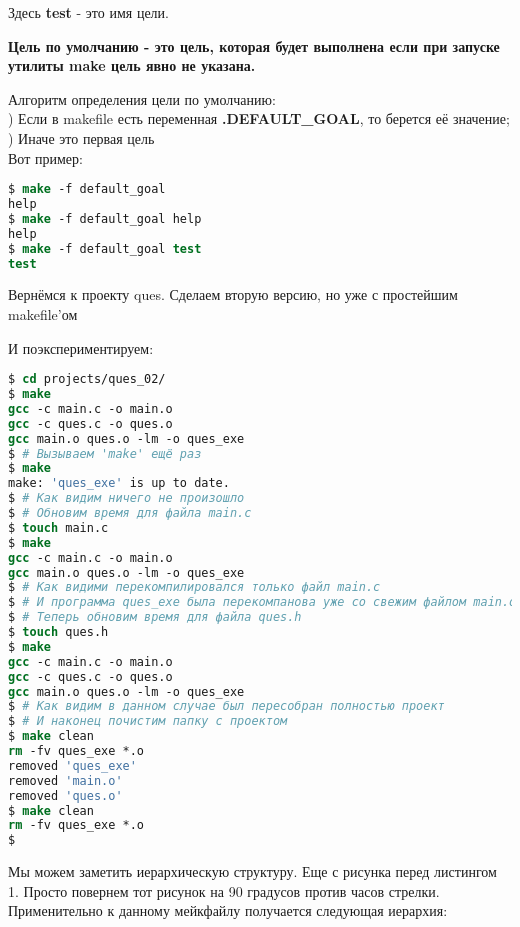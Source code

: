Здесь \textbf{test} - это имя цели.

{\bfseries \label{default_target_def}
Цель по умолчанию - это цель, которая будет выполнена если при запуске утилиты make цель явно не указана.
}

Алгоритм определения цели по умолчанию: \\
) Если в makefile есть переменная \textbf{.DEFAULT\_GOAL}, то берется её значение; \\
) Иначе это первая цель \\

Вот пример:



\begin{lstlisting}[language=csh]
$ make -f default_goal
help
$ make -f default_goal help
help
$ make -f default_goal test
test
\end{lstlisting}

Вернёмся к проекту ques. Сделаем вторую версию, но уже с простейшим makefile'ом



И поэкспериментируем:

\begin{lstlisting}[language=csh]
$ cd projects/ques_02/
$ make
gcc -c main.c -o main.o
gcc -c ques.c -o ques.o
gcc main.o ques.o -lm -o ques_exe
$ # Вызываем 'make' ещё раз
$ make
make: 'ques_exe' is up to date.
$ # Как видим ничего не произошло
$ # Обновим время для файла main.c
$ touch main.c
$ make
gcc -c main.c -o main.o
gcc main.o ques.o -lm -o ques_exe
$ # Как видими перекомпилировался только файл main.c
$ # И программа ques_exe была перекомпанова уже со свежим файлом main.o
$ # Теперь обновим время для файла ques.h
$ touch ques.h
$ make
gcc -c main.c -o main.o
gcc -c ques.c -o ques.o
gcc main.o ques.o -lm -o ques_exe
$ # Как видим в данном случае был пересобран полностью проект
$ # И наконец почистим папку с проектом
$ make clean
rm -fv ques_exe *.o
removed 'ques_exe'
removed 'main.o'
removed 'ques.o'
$ make clean
rm -fv ques_exe *.o
$
\end{lstlisting}

Мы можем заметить иерархическую структуру. Еще с рисунка перед листингом 1. Просто повернем тот рисунок на 90 градусов против часов стрелки. Применительно к данному мейкфайлу получается следующая иерархия:

\texttt{}

